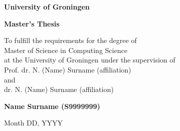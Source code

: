 \begin{center}

\vspace{3cm}%

\textbf{University of Groningen}

\vspace{1cm}%

{\Large\textbf{\theprojecttitle}}

\vspace{2.5cm}%

\textbf{Master's Thesis}

\vspace{0.5cm}%

To fulfill the requirements for the degree of\\
Master of Science in Computing Science\\
at the University of Groningen under the supervision of\\
Prof. dr. N. (Name) Surname (affiliation)\\
and\\ %
dr. N. (Name) Surname (affiliation)\\

\vspace{3cm}%

\textbf{Name Surname (S9999999)}

\vspace{3cm}%

Month DD, YYYY

\end{center}

\clearpage
